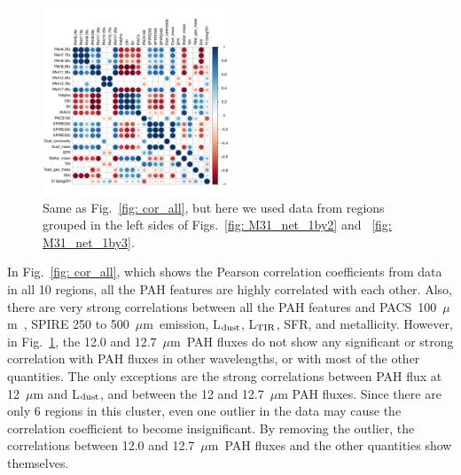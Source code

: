         \begin{figure}
        \includegraphics[width=0.5\textwidth]{../images0.01/cor_plots/M31_derived_3_to_8_core_plot_for_paper.pdf}%
        \caption{Same as Fig.~\ref{fig: cor_all}, but here we used data from regions grouped in the left sides of Figs.~\ref{fig: M31_net_1by2} and ~\ref{fig: M31_net_1by3}. }
          \label{fig: cor_cluster1}
        \end{figure}
        
        In Fig.~\ref{fig: cor_all}, which shows the Pearson correlation coefficients from data in all 10 regions, all the PAH features are highly correlated with each other. 
        Also, there are very strong correlations between all the PAH features and PACS~100~$\mu$m~, SPIRE 250 to 500~$\mu$m~emission, L$_{\rm dust}$, L$_{\rm TIR}$, SFR, and metallicity.
        However, in Fig.~\ref{fig: cor_cluster1}, the 12.0 and 12.7~$\mu$m~PAH fluxes do not show any significant or strong correlation with PAH fluxes in other wavelengths, or with most of the other quantities.
        The only exceptions are the strong correlations between PAH flux at 12~$\mu$m and L$_{\rm dust}$, and between the 12 and 12.7~$\mu$m PAH fluxes.
        Since there are only 6 regions in this cluster, even one outlier in the data may cause the correlation coefficient to become insignificant.
        By removing the outlier, the correlations between 12.0 and 12.7~$\mu$m~PAH fluxes and the other quantities show themselves. %
        
